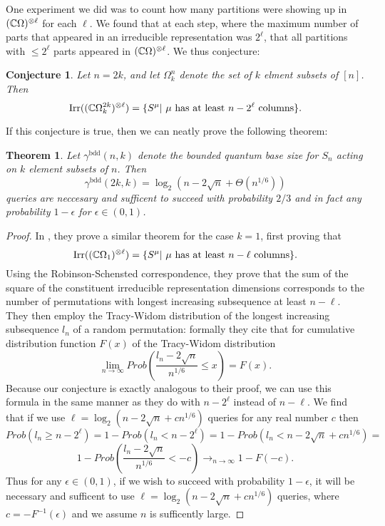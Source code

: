 \documentclass[12pt,twoside]{reedthesis}
\theoremstyle{plain}   %
\newtheorem{thm}{Theorem}[section] %
\newtheorem{conj}{Conjecture}[section]
\theoremstyle{definition}
\theoremstyle{remark}
\numberwithin{equation}{section}
\def\irr{\mathrm{Irr}}
\begin{document}
One experiment we did was to count how many partitions were showing up in $(\mathbb{C} \Omega)^{\otimes \ell}$ for each $\ell$.
We found that at each step, where the maximum number of parts that appeared in an irreducible representation was $2^\ell$, that all partitions with $\leq 2^\ell$ parts appeared in $(\mathbb{C} \Omega)^{\otimes \ell}$.
We thus conjecture:
\begin{conj}
  Let $n = 2k$, and let $\Omega^{n}_k$ denote the set of $k$ elment subsets of $[n]$. Then
  \[\irr((\CC \Omega^{2k}_k)^{\otimes \ell}) = \{S^\mu |  \text{ $\mu$ has at least $n - 2^\ell$ columns}\}.\]
\end{conj}
If this conjecture is true, then we can neatly prove the following theorem:
\begin{thm}
  Let $\gamma^{\mathrm{bdd}}(n,k)$ denote the bounded quantum base size for $S_n$ acting on $k$ element subsets of $n$. Then
  \[ \gamma^{\mathrm{bdd}}(2k,k) = \log_2(n -2\sqrt{n} + \Theta(n^{1/6}))\]
  queries are neccesary and sufficent to succeed with probability $2/3$ and in fact any probability $1 - \epsilon$ for $\epsilon \in (0,1)$.
\end{thm}
\begin{proof}
  In \cite{copeland}, they prove a similar theorem for the case $k=1$, first proving that
  \[\irr((\CC \Omega_1)^{\otimes\ell}) = \{ S^\mu | \text{ $\mu$ has at least $n - \ell$ columns}\}.\]
  Using the Robinson-Schensted correspondence, they prove that the sum of the square of the constituent irreducible representation dimensions corresponds to the number of permutations with longest increasing subsequence
  at least $n-\ell$.
  They then employ the Tracy-Widom distribution
  of the longest increasing subsequence $l_n$ of a random permutation: formally they cite that for cumulative distribution function $F(x)$ of the Tracy-Widom distribution
  \[ \lim_{n \rightarrow \infty} Prob \left( \dfrac{l_n - 2 \sqrt{n}}{n^{1/6}} \leq x \right) = F(x).\]
  Because our conjecture is exactly analogous to their proof, we can use this formula in the same manner as they do with $n- 2^\ell$ instead of $n -\ell$.
  We find that if we use $\ell = \log_2( n - 2 \sqrt{n} + cn^{1/6})$ queries for any real number $c$ then
  \[Prob( l_n \geq n - 2^\ell) = 1 - Prob( l_n <  n - 2^\ell) = 1 - Prob( l_n <  n - 2 \sqrt{n} + cn^{1/6}) = \]
  \[ 1 - Prob \left(\dfrac{l_n - 2 \sqrt{n}}{n^{1/6}} < -c \right) \rightarrow_{n \rightarrow \infty} 1 - F(-c).\]
  Thus for any $\epsilon \in (0,1)$, if we wish to succeed with probability $1- \epsilon$, it will be necessary and sufficent to use $\ell = \log_2( n - 2 \sqrt{n} + cn^{1/6})$ queries, where $c = -F^{-1}(\epsilon)$
  and we assume $n$ is sufficently large.
\end{proof}
\end{document}
